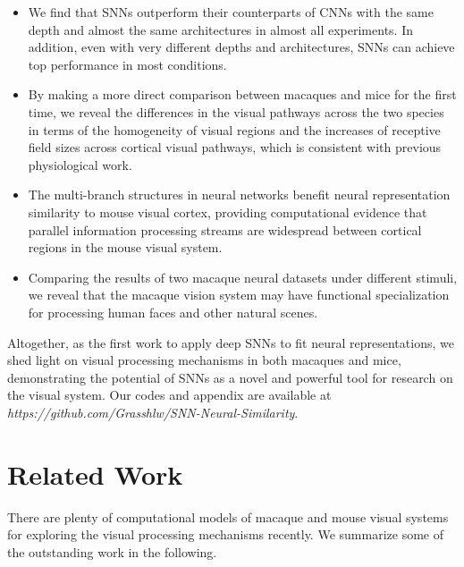 \documentclass[letterpaper]{article} %
\begin{document}
\begin{itemize}
	\item We find that SNNs outperform their counterparts of CNNs with the same depth and almost the same architectures in almost all experiments. In addition, even with very different depths and architectures, SNNs can achieve top performance in most conditions.
	\item By making a more direct comparison between macaques and mice for the first time, we reveal the differences in the visual pathways across the two species in terms of the homogeneity of visual regions and the increases of receptive field sizes across cortical visual pathways, which is consistent with previous physiological work. 
	\item The multi-branch structures in neural networks benefit neural representation similarity to mouse visual cortex, providing computational evidence that parallel information processing streams are widespread between cortical regions in the mouse visual system.
	\item Comparing the results of two macaque neural datasets under different stimuli, we reveal that the macaque vision system may have functional specialization for processing human faces and other natural scenes.
\end{itemize}

Altogether, as the first work to apply deep SNNs to fit neural representations, we shed light on visual processing mechanisms in both macaques and mice, demonstrating the potential of SNNs as a novel and powerful tool for research on the visual system. Our codes and appendix are available at \textit{https://github.com/Grasshlw/SNN-Neural-Similarity}.

\section{Related Work}
\label{related-work}

There are plenty of computational models of macaque and mouse visual systems for exploring the visual processing mechanisms recently. We summarize some of the outstanding work in the following.
\end{document}
